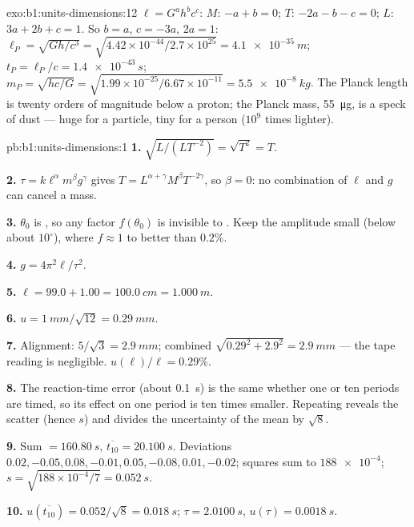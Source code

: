 \begin{solution}{exo:b1:units-dimensions:12}
$\ell = G^a h^b c^c$: $M$: $-a + b = 0$; $T$: $-2a - b - c = 0$; $L$:
$3a + 2b + c = 1$. So $b = a$, $c = -3a$, $2a = 1$:
$\ell_P = \sqrt{Gh/c^3} = \sqrt{4.42\times10^{-44}/2.7\times10^{25}}
= \qty{4.1e-35}{m}$; $t_P = \ell_P/c = \qty{1.4e-43}{s}$;
$m_P = \sqrt{hc/G} = \sqrt{1.99\times10^{-25}/6.67\times10^{-11}}
= \qty{5.5e-8}{kg}$. The Planck length is twenty orders of magnitude
below a proton; the Planck mass, \qty{55}{\micro g}, is a speck of dust
--- huge for a particle, tiny for a person ($10^9$ times lighter).
\end{solution}

\begin{solution}{pb:b1:units-dimensions:1}
\textbf{1.} $\sqrt{L/(L T^{-2})} = \sqrt{T^2} = T$.

\textbf{2.} $\tau = k\ell^\alpha m^\beta g^\gamma$ gives
$T = L^{\alpha+\gamma} M^\beta T^{-2\gamma}$, so $\beta = 0$: no
combination of $\ell$ and $g$ can cancel a mass.

\textbf{3.} $\theta_0$ is , so any factor $f(\theta_0)$ is
invisible to . Keep the amplitude small (below about
$10^\circ$), where $f \approx 1$ to better than $0.2\%$.

\textbf{4.} $g = 4\pi^2\ell/\tau^2$.

\textbf{5.} $\ell = 99.0 + 1.00 = \qty{100.0}{cm} = \qty{1.000}{m}$.

\textbf{6.} $u = \qty{1}{mm}/\sqrt{12} = \qty{0.29}{mm}$.

\textbf{7.} Alignment: $5/\sqrt3 = \qty{2.9}{mm}$; combined
$\sqrt{0.29^2 + 2.9^2} = \qty{2.9}{mm}$ --- the tape reading is
negligible. $u(\ell)/\ell = 0.29\%$.

\textbf{8.} The reaction-time error (about \qty{0.1}{s}) is the same
whether one or ten periods are timed, so its effect on one period is
ten times smaller. Repeating reveals the scatter (hence $s$) and
divides the uncertainty of the mean by $\sqrt8$.

\textbf{9.} Sum $= \qty{160.80}{s}$, $\overline{t_{10}} = \qty{20.100}{s}$.
Deviations $0.02, -0.05, 0.08, -0.01, 0.05, -0.08, 0.01, -0.02$; squares
sum to $\num{188e-4}$; $s = \sqrt{188\times10^{-4}/7} = \qty{0.052}{s}$.

\textbf{10.} $u(\overline{t_{10}}) = 0.052/\sqrt8 = \qty{0.018}{s}$;
$\tau = \qty{2.0100}{s}$, $u(\tau) = \qty{0.0018}{s}$.


\end{solution}
